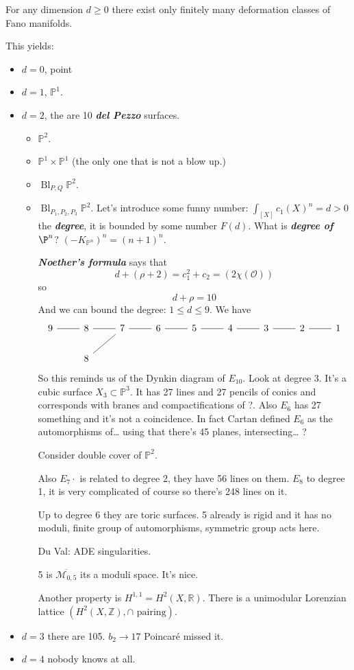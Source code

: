 	\begin{thm}
		For any dimension $d\geq0$ there exist only finitely many deformation classes of Fano manifolds.
	\end{thm}
	This yields:
	\begin{itemize}
		\item $d=0$, point
		\item $d=1$, $\mathbb{P}^1$.
		\item $d=2$, the are 10 \textbf{\textit{del Pezzo}} surfaces.
		\begin{itemize}
			\item $\mathbb{P}^2$.
			\item $\mathbb{P}^1\times \mathbb{P}^1$ (the only one that is not a blow up.)
			\item $\operatorname{B l}_{P,Q}\mathbb{P}^2$.
			\item $\operatorname{B l}_{P_1,P_2,P_3}\mathbb{P}^2$.
			Let's introduce some funny number: $\int_{[X]}c_1(X)^n=d>0$ the \textbf{\textit{degree}}, it is bounded by some number $F(d)$. What is \textbf{\textit{degree of $\P^n$}}? $(-K_{\mathbb{P}^n})^n=(n+1)^n$.
			
			\textbf{\textit{Noether's formula}} says that 
			\[d+(\rho+2)=c_1^2+c_2=(2\chi(\mathcal{O}))\]
			so
			\[d+\rho=10\]
			And we can bound the degree: $1\leq d\leq 9$. We have
			\[\begin{tikzcd}
				9\arrow[r,no head]&8\arrow[r,no head]&7\arrow[ld,no head]\arrow[r,no head]&6\arrow[r,no head]&5\arrow[r,no head]&4\arrow[r,no head]&3\arrow[r,no head]&2\arrow[r,no head]&1\\
				&8
			\end{tikzcd}\]
			So this reminds us of the Dynkin diagram of $E_{10}$. Look at degree 3. It's a cubic surface $X_3\subset\mathbb{P}^3$. It has 27 lines and 27 pencils of conics and corresponds with branes and compactifications of ?. Also $E_6$ has 27 something and it's not a coincidence. In fact Cartan defined $E_6$ as the automorphisms of… using that there's 45 planes, intersecting… ?
			
			Consider double cover of $\mathbb{P}^2$.
			
			Also $E_7·$ is related to degree 2, they have 56 lines on them. $E_8$ to degree 1, it is very complicated of course so there's 248 lines on it.
			
			Up to degree 6 they are toric surfaces. 5 already is rigid and it has no moduli, finite group of automorphisms, symmetric group acts here.
			
			Du Val: ADE singularities.
			
			5 is $\overline{\mathcal{M}_{0,5}}$ its a moduli space. It's nice.
			
			Another property is $H^{1,1}=H^2(X,\mathbb{R})$. There is a unimodular Lorenzian lattice $(H^2(X,\mathbb{Z}),\cap\text{ pairing})$.
		\end{itemize}
		\item $d=3$ there are 105. $b_2\to 17$ Poincaré missed it.
		\item $d=4$ nobody knows at all.
	\end{itemize}
	
